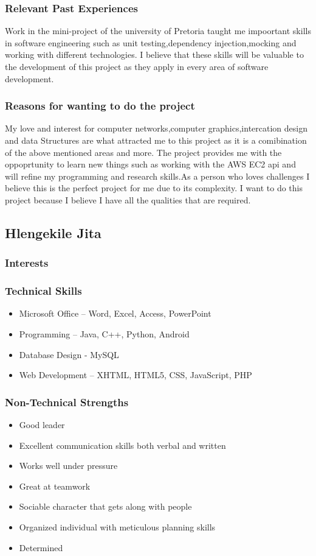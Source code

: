 \documentclass[a4paper,12pt]{article}
\begin{document}
\subsubsection{Relevant Past Experiences}
Work in the mini-project of the university of Pretoria taught me impoortant skills in software engineering such as unit testing,dependency injection,mocking and working with different technologies. I believe that these skills will be valuable to the development of this project as they apply in every area of software development.
\subsubsection{Reasons for wanting to do the project}
\begin{flushleft}
My love and interest for computer networks,computer graphics,intercation design and data Structures are what attracted me to this project as it is a comibination of the above mentioned areas and more. The project provides me with the oppoprtunity to learn new things such as working with the AWS EC2 api and will refine my programming and research skills.As a person who loves challenges I believe this is the perfect project for me due to its complexity. I want to do this project because I believe I have all the qualities that are required.
\end{flushleft}
\subsection{Hlengekile Jita}
\subsubsection{Interests}
\subsubsection{Technical Skills}
\begin{itemize}
\item Microsoft Office – Word, Excel, Access, PowerPoint
\item Programming – Java, C++, Python, Android
\item Database Design - MySQL
\item Web Development – XHTML, HTML5, CSS, JavaScript, PHP
\end{itemize}
\subsubsection{Non-Technical Strengths}
\begin{itemize}
\item Good leader
\item Excellent communication skills both verbal and written
\item Works well under pressure
\item Great at teamwork
\item Sociable character that gets along with people
\item Organized individual with meticulous planning skills
\item Determined
\end{itemize}
\end{document}
